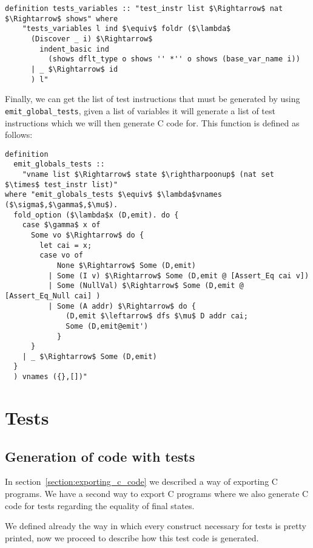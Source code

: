 \begin{lstlisting}[mathescape=true, frame=single]
  definition tests_variables :: "test_instr list $\Rightarrow$ nat $\Rightarrow$ shows" where
    "tests_variables l ind $\equiv$ foldr ($\lambda$
      (Discover _ i) $\Rightarrow$
        indent_basic ind
          (shows dflt_type o shows '' *'' o shows (base_var_name i))
      | _ $\Rightarrow$ id
      ) l"
\end{lstlisting}


Finally, we can get the list of test instructions that must be generated by using \verb|emit_global_tests|, given a list of variables it will generate a list of test instructions which we will then generate C code for.
This function is defined as follows:


\begin{lstlisting}[mathescape=true, frame=single]
definition
  emit_globals_tests ::
    "vname list $\Rightarrow$ state $\rightharpoonup$ (nat set $\times$ test_instr list)"
where "emit_globals_tests $\equiv$ $\lambda$vnames ($\sigma$,$\gamma$,$\mu$).
  fold_option ($\lambda$x (D,emit). do {
    case $\gamma$ x of
      Some vo $\Rightarrow$ do {
        let cai = x;
        case vo of
            None $\Rightarrow$ Some (D,emit)
          | Some (I v) $\Rightarrow$ Some (D,emit @ [Assert_Eq cai v])
          | Some (NullVal) $\Rightarrow$ Some (D,emit @ [Assert_Eq_Null cai] )
          | Some (A addr) $\Rightarrow$ do {
              (D,emit $\leftarrow$ dfs $\mu$ D addr cai;
              Some (D,emit@emit')
            }
      }
    | _ $\Rightarrow$ Some (D,emit)
  }
  ) vnames ({},[])"
\end{lstlisting}


\section{Tests}

\subsection{Generation of code with tests}\label{subsection:codegen_with_tests}

In section~\ref{section:exporting_c_code} we described a way of exporting C programs.
We have a second way to export C programs where we also generate C code for tests regarding the equality of final states.

We defined already the way in which every construct necessary for tests is pretty printed, now we proceed to describe how this test code is generated.

